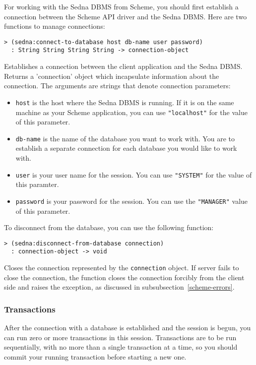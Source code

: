 \documentclass[a4paper,12pt]{article}
\begin{document}
For working with the Sedna DBMS from Scheme, you should first establish a
connection between the Scheme API driver and the Sedna DBMS.
Here are two functions to manage connections:

\begin{verbatim}> (sedna:connect-to-database host db-name user password)
  : String String String String -> connection-object\end{verbatim}

Establishes a connection between the client application and the Sedna DBMS.
Returns a 'connection' object which incapsulate information about the
connection.
The arguments are strings that denote connection parameters:
\begin{itemize}
\item \texttt{host} is the host where the Sedna DBMS is running.
 If it is on the same machine as your Scheme application, you can use
 \texttt{"localhost"} for the value of this parameter.
\item \texttt{db-name} is the name of the database you want to work with.
 You are to establish a separate connection for each database you would like to
 work with.
\item \texttt{user} is your user name for the session.
 You can use \texttt{"SYSTEM"} for the value of this paramter.
\item \texttt{password} is your password for the session.
 You can use the \texttt{"MANAGER"} value of this parameter.
\end{itemize}

To disconnect from the database, you can use the following function:

\begin{verbatim}> (sedna:disconnect-from-database connection)
  : connection-object -> void\end{verbatim}

Closes the connection represented by the \texttt{connection} object.
If server fails to close the connection, the function closes the connection
forcibly from the client side and raises the exception, as discussed
in subsubsection~\ref{scheme-errors}.


\subsubsection{Transactions}

After the connection with a database is established and the session is begun,
you can run zero or more transactions in this session.
Transactions are to be run sequentially, with no more than a single transaction
at a time, so you should commit your running transaction before starting a
new one.
\end{document}
